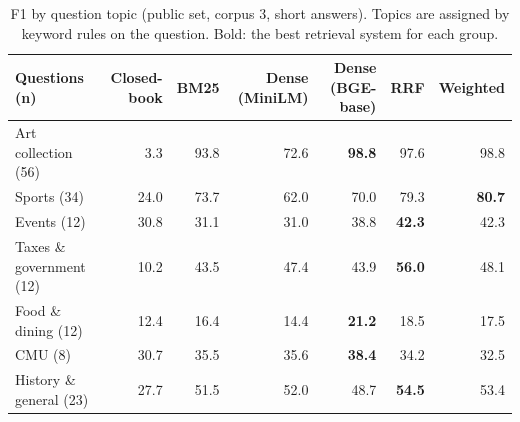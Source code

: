 \begin{table}[t]
\centering
\small
\begin{tabular}{lrrrrrr}
\toprule
Questions (n) & Closed-book & BM25 & Dense (MiniLM) & Dense (BGE-base) & RRF & Weighted \\
\midrule
Art collection (56) & 3.3 & 93.8 & 72.6 & \textbf{98.8} & 97.6 & 98.8 \\
Sports (34) & 24.0 & 73.7 & 62.0 & 70.0 & 79.3 & \textbf{80.7} \\
Events (12) & 30.8 & 31.1 & 31.0 & 38.8 & \textbf{42.3} & 42.3 \\
Taxes \& government (12) & 10.2 & 43.5 & 47.4 & 43.9 & \textbf{56.0} & 48.1 \\
Food \& dining (12) & 12.4 & 16.4 & 14.4 & \textbf{21.2} & 18.5 & 17.5 \\
CMU (8) & 30.7 & 35.5 & 35.6 & \textbf{38.4} & 34.2 & 32.5 \\
History \& general (23) & 27.7 & 51.5 & 52.0 & 48.7 & \textbf{54.5} & 53.4 \\
\bottomrule
\end{tabular}
\caption{F1 by question topic (public set, corpus 3, short answers). Topics are assigned by keyword rules on the question. Bold: the best retrieval system for each group.}
\label{tab:by_topic}
\end{table}
